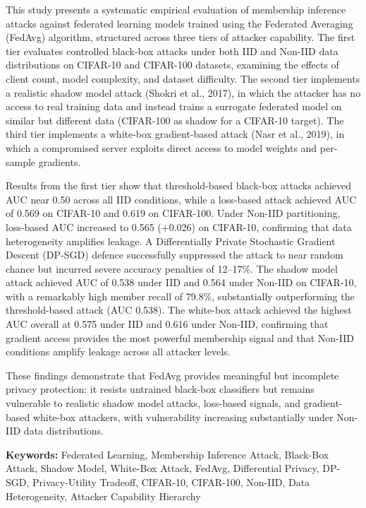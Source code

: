 \documentclass[12pt, a4paper]{report}
\begin{document}
This study presents a systematic empirical evaluation of membership inference
attacks against federated learning models trained using the Federated Averaging
(FedAvg) algorithm, structured across three tiers of attacker capability. The
first tier evaluates controlled black-box attacks under both IID and Non-IID data
distributions on CIFAR-10 and CIFAR-100 datasets, examining the effects of client
count, model complexity, and dataset difficulty. The second tier implements a
realistic shadow model attack (Shokri et al., 2017), in which the attacker has
no access to real training data and instead trains a surrogate federated model on
similar but different data (CIFAR-100 as shadow for a CIFAR-10 target). The third
tier implements a white-box gradient-based attack (Nasr et al., 2019), in which a
compromised server exploits direct access to model weights and per-sample
gradients.

Results from the first tier show that threshold-based black-box attacks
achieved AUC near 0.50 across all IID conditions, while a loss-based attack
achieved AUC of 0.569 on CIFAR-10 and 0.619 on CIFAR-100. Under Non-IID
partitioning, loss-based AUC increased to 0.565 (+0.026) on CIFAR-10, confirming
that data heterogeneity amplifies leakage. A Differentially Private Stochastic
Gradient Descent (DP-SGD) defence successfully suppressed the attack to near
random chance but incurred severe accuracy penalties of 12--17\%. The shadow model
attack achieved AUC of 0.538 under IID and 0.564 under Non-IID on CIFAR-10,
with a remarkably high member recall of 79.8\%, substantially outperforming the
threshold-based attack (AUC 0.538). The white-box attack achieved the
highest AUC overall at 0.575 under IID and 0.616 under Non-IID, confirming that
gradient access provides the most powerful membership signal and that Non-IID
conditions amplify leakage across all attacker levels.

These findings demonstrate that FedAvg provides meaningful but incomplete privacy
protection: it resists untrained black-box classifiers but remains vulnerable to
realistic shadow model attacks, loss-based signals, and gradient-based white-box
attackers, with vulnerability increasing substantially under Non-IID data
distributions.

\vspace{0.5cm}
\noindent\textbf{Keywords:} Federated Learning, Membership Inference Attack,
Black-Box Attack, Shadow Model, White-Box Attack, FedAvg, Differential Privacy,
DP-SGD, Privacy-Utility Tradeoff, CIFAR-10, CIFAR-100, Non-IID, Data Heterogeneity,
Attacker Capability Hierarchy
\end{document}
